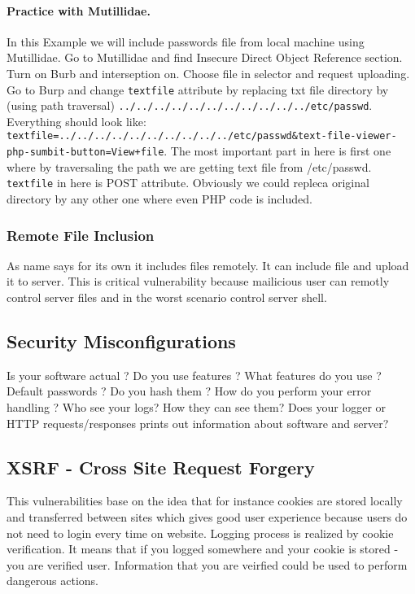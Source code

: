 \documentclass{article}[12pt]
\begin{document}
\paragraph{Practice with Mutillidae. }
In this Example we will include passwords file from local machine using Mutillidae. Go to Mutillidae and find Insecure Direct Object Reference section. Turn on Burb and interseption on. Choose file in selector and request uploading. Go to Burp and change \texttt{textfile} attribute by replacing txt file directory by (using path traversal) \texttt{../../../../../../../../../../../etc/passwd}. Everything should look like: \texttt{textfile=../../../../../../../../../../etc/passwd\&text-file-viewer-php-sumbit-button=View+file}. The most important part in here is first one where by traversaling the path we are getting text file from /etc/passwd. \texttt{textfile} in here is POST attribute. Obviously we could repleca original directory by any other one where even PHP code is included.

\subsubsection{Remote File Inclusion} As name says for its own it includes files remotely. It can include file and upload it to server. This is critical vulnerability because mailicious user can remotly control server files and in the worst scenario control server shell.



\subsection{Security Misconfigurations}
Is your software actual ? \newline
Do you use features ? What features do you use ? \newline
Default passwords ? Do you hash them ? \newline
How do you perform your error handling ? \newline
Who see your logs? How they can see them? \newline
Does your logger or HTTP requests/responses prints out information about software and server?



\subsection{XSRF - Cross Site Request Forgery} This vulnerabilities base on the idea that for instance cookies are stored locally and transferred between sites which gives good user experience because users do not need to login every time on website. Logging process is realized by cookie verification. It means that if you logged somewhere and your cookie is stored - you are verified user. Information that you are veirfied could be used to perform dangerous actions.
\end{document}
